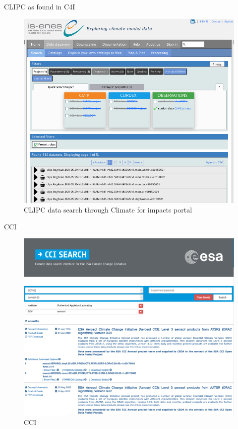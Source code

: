 \documentclass[final,1p,times,twocolumn,authoryear]{elsarticle}
\begin{document}
{{CLIPC as found in C4I
\begin{figure}
    \centering
    \includegraphics[scale=0.4]{images/CLIPC-search-in-C4I.png}
    \caption{CLIPC data search through Climate for impacts portal}
    \label{fig:my_label}
\end{figure}



CCI 
\begin{figure}
    \centering
    \includegraphics[scale=0.3]{images/CCI.png}
    \caption{CCI}
    \label{fig:my_label}
\end{figure}


}}
\end{document}
